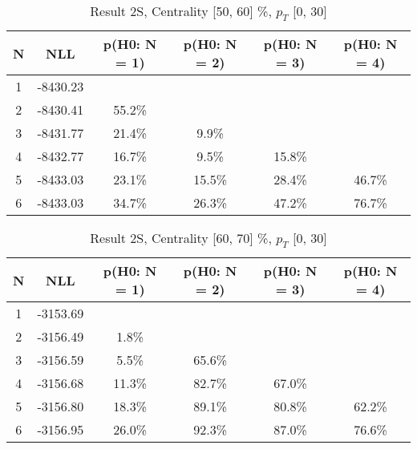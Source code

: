 \begin{table}[htb]
	\begin{center}
	\caption{Result 2S, Centrality [50, 60] \%, $p_{T}$ [0, 30] \GeV
}
{\footnotesize\renewcommand{\arraystretch}{1.4}
		\begin{tabular}{cc||>{\columncolor[gray]{0.8}}cccc}
			N & NLL & p(H0: N = 1) & p(H0: N = 2) & p(H0: N = 3) & p(H0: N = 4)\\ 
		\hline
1 & -8430.23 & & & & \\
2 & -8430.41 & 55.2\% & & & \\
3 & -8431.77 & 21.4\% & 9.9\% & & \\
4 & -8432.77 & 16.7\% & 9.5\% & 15.8\% & \\
5 & -8433.03 & 23.1\% & 15.5\% & 28.4\% & 46.7\% \\
6 & -8433.03 & 34.7\% & 26.3\% & 47.2\% & 76.7\% \\
	\end{tabular}
		\label{tab:lab}
	}
	\end{center}\end{table}

\begin{table}[htb]
	\begin{center}
	\caption{Result 2S, Centrality [60, 70] \%, $p_{T}$ [0, 30] \GeV
}
{\footnotesize\renewcommand{\arraystretch}{1.4}
		\begin{tabular}{cc||c>{\columncolor[gray]{0.8}}ccc}
			N & NLL & p(H0: N = 1) & p(H0: N = 2) & p(H0: N = 3) & p(H0: N = 4)\\ 
		\hline
1 & -3153.69 & & & & \\
2 & -3156.49 & 1.8\% & & & \\
3 & -3156.59 & 5.5\% & 65.6\% & & \\
4 & -3156.68 & 11.3\% & 82.7\% & 67.0\% & \\
5 & -3156.80 & 18.3\% & 89.1\% & 80.8\% & 62.2\% \\
6 & -3156.95 & 26.0\% & 92.3\% & 87.0\% & 76.6\% \\
	\end{tabular}
		\label{tab:lab}
	}
	\end{center}\end{table}

